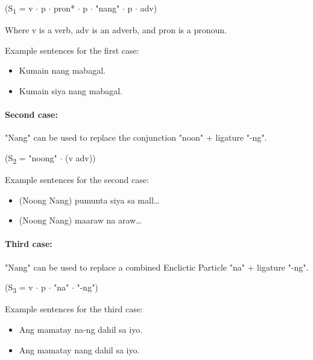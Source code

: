 \begin{center}
    (S\textsubscript{1} = v \(\cdot\) p \(\cdot\) pron* \(\cdot\) p \(\cdot\)
    "nang" \(\cdot\) p \(\cdot\) adv)
\end{center}

Where v is a verb, adv is an adverb, and pron is a pronoun.

\begin{example}
    Example sentences for the first case:
\end{example}
\begin{itemize}
    \item Kumain nang mabagal.
    \item             Kumain siya nang mabagal.

\end{itemize}

\paragraph{Second case:} "Nang" can be used to replace the conjunction "noon" +
ligature "-ng".

\begin{center}
    (S\textsubscript{2} = "noong" \(\cdot\) (v {\textpipe} adv))
\end{center}

\begin{example}
    Example sentences for the second case:
\end{example}

\begin{itemize}
    \item (Noong {\textpipe} Nang) pumunta siya sa mall…
    \item (Noong {\textpipe} Nang) maaraw na araw…
\end{itemize}

\paragraph{Third case:} "Nang" can be used to replace a combined Enclictic Particle
"na" + ligature "-ng".

\begin{center}
    (S\textsubscript{3} = v \(\cdot\) p \(\cdot\) "na" \(\cdot\) "-ng")
\end{center}

\begin{example}
    Example sentences for the third case:
\end{example}
\begin{itemize}
    \item Ang mamatay na-ng dahil sa iyo.
    \item Ang mamatay nang dahil sa iyo.
\end{itemize}

